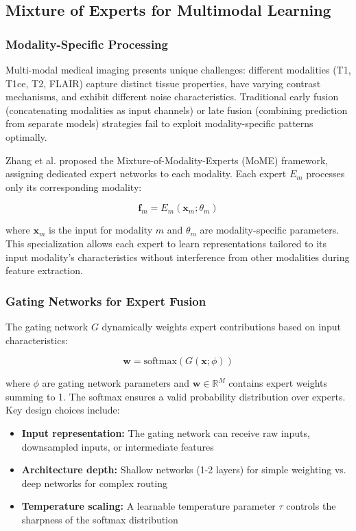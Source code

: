 \documentclass[conference]{IEEEtran}
\begin{document}
\subsection{Mixture of Experts for Multimodal Learning}

\subsubsection{Modality-Specific Processing}

Multi-modal medical imaging presents unique challenges: different modalities (T1, T1ce, T2, FLAIR) capture distinct tissue properties, have varying contrast mechanisms, and exhibit different noise characteristics. Traditional early fusion (concatenating modalities as input channels) or late fusion (combining prediction from separate models) strategies fail to exploit modality-specific patterns optimally.

Zhang et al. \cite{zhang2024mome} proposed the Mixture-of-Modality-Experts (MoME) framework, assigning dedicated expert networks to each modality. Each expert $E_m$ processes only its corresponding modality:

\begin{equation}
\mathbf{f}_m = E_m(\mathbf{x}_m; \theta_m)
\end{equation}

where $\mathbf{x}_m$ is the input for modality $m$ and $\theta_m$ are modality-specific parameters. This specialization allows each expert to learn representations tailored to its input modality's characteristics without interference from other modalities during feature extraction.

\subsubsection{Gating Networks for Expert Fusion}

The gating network $G$ dynamically weights expert contributions based on input characteristics:

\begin{equation}
\mathbf{w} = \text{softmax}(G(\mathbf{x}; \phi))
\end{equation}

where $\phi$ are gating network parameters and $\mathbf{w} \in \mathbb{R}^M$ contains expert weights summing to 1. The softmax ensures a valid probability distribution over experts. Key design choices include:

\begin{itemize}
\item \textbf{Input representation:} The gating network can receive raw inputs, downsampled inputs, or intermediate features
\item \textbf{Architecture depth:} Shallow networks (1-2 layers) for simple weighting vs. deep networks for complex routing
\item \textbf{Temperature scaling:} A learnable temperature parameter $\tau$ controls the sharpness of the softmax distribution
\end{itemize}
\end{document}
